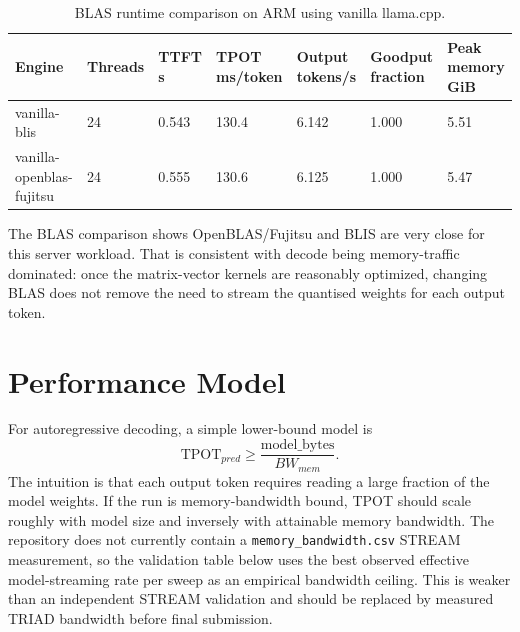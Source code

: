\documentclass[11pt,a4paper]{article}
\begin{document}
\begin{table}[htbp]
\centering
\small
\begin{tabular}{lllllll}
\hline
Engine & Threads & TTFT s & TPOT ms/token & Output tokens/s & Goodput fraction & Peak memory GiB \\
\hline
vanilla-blis & 24 & 0.543 & 130.4 & 6.142 & 1.000 & 5.51 \\
vanilla-openblas-fujitsu & 24 & 0.555 & 130.6 & 6.125 & 1.000 & 5.47 \\
\hline
\end{tabular}
\caption{BLAS runtime comparison on ARM using vanilla llama.cpp.}
\label{tab:blas}
\end{table}

The BLAS comparison shows OpenBLAS/Fujitsu and BLIS are very close for this
server workload. That is consistent with decode being memory-traffic dominated:
once the matrix-vector kernels are reasonably optimized, changing BLAS does not
remove the need to stream the quantised weights for each output token.

\section{Performance Model}

For autoregressive decoding, a simple lower-bound model is
\[
  \mathrm{TPOT}_{pred} \geq \frac{\mathrm{model\_bytes}}{BW_{mem}}.
\]
The intuition is that each output token requires reading a large fraction of the
model weights. If the run is memory-bandwidth bound, TPOT should scale roughly
with model size and inversely with attainable memory bandwidth. The repository
does not currently contain a \texttt{memory\_bandwidth.csv} STREAM measurement,
so the validation table below uses the best observed effective model-streaming
rate per sweep as an empirical bandwidth ceiling. This is weaker than an
independent STREAM validation and should be replaced by measured TRIAD bandwidth
before final submission.
\end{document}

